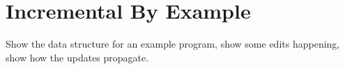 
\section{Incremental By Example}%
\label{sec:Incremental By Example}

Show the data structure for an example program, show some edits happening, show how the updates propagate. 